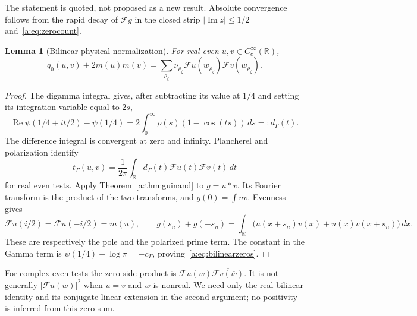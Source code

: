 \documentclass[11pt,a4paper]{article}
\numberwithin{equation}{section}
\newtheorem{lemma}[theorem]{Lemma}
\theoremstyle{definition}\newtheorem{definition}[theorem]{Definition}
\theoremstyle{remark}\newtheorem{remark}[theorem]{Remark}
\newcommand{\R}{\mathbb R}\newcommand{\C}{\mathbb C}\newcommand{\N}{\mathbb N}
\newcommand{\tg}{t_\Gamma}\newcommand{\cg}{c_\Gamma}
\begin{document}
The statement is quoted, not proposed as a new result. Absolute convergence follows from the rapid decay of $\mathcal Fg$ in the closed strip $|\operatorname{Im}z|\le1/2$ and~\eqref{a:eq:zerocount}.

\begin{lemma}[Bilinear physical normalization]\label{a:lem:bilinear}
For real even $u,v\in C_c^\infty(\R)$,
\begin{equation}\label{a:eq:bilinearzeros}
 q_0(u,v)+2m(u)m(v)
   =\sum_{\rho_\zeta}\nu_{\rho_\zeta}
       \mathcal Fu(w_{\rho_\zeta})\mathcal Fv(w_{\rho_\zeta}).
\end{equation}
\end{lemma}
\begin{proof}
The digamma integral \cite[Eq.~5.9.16]{DLMF} gives, after subtracting its value at $1/4$ and setting its integration variable equal to $2s$,
\begin{equation}\label{a:eq:digammamultiplier}
 \operatorname{Re}\psi(1/4+it/2)-\psi(1/4)
    =2\int_0^\infty\rho(s)(1-\cos(ts))\,ds=:d_\Gamma(t).
\end{equation}
The difference integral is convergent at zero and infinity. Plancherel and polarization identify
\[
 \tg(u,v)=\frac1{2\pi}\int_\R
       d_\Gamma(t)\mathcal Fu(t)\mathcal Fv(t)\,dt
\]
for real even tests. Apply Theorem~\ref{a:thm:guinand} to $g=u*v$. Its Fourier transform is the product of the two transforms, and $g(0)=\int uv$. Evenness gives
\[
 \mathcal Fu(i/2)=\mathcal Fu(-i/2)=m(u),\qquad
 g(s_n)+g(-s_n)
  =\int_\R\bigl(u(x+s_n)v(x)+u(x)v(x+s_n)\bigr)\,dx.
\]
These are respectively the pole and the polarized prime term. The constant in the Gamma term is $\psi(1/4)-\log\pi=-\cg$, proving~\eqref{a:eq:bilinearzeros}.
\end{proof}

For complex even tests the zero-side product is
$\mathcal Fu(w)\overline{\mathcal Fv(\overline w)}$. It is not generally $|\mathcal Fu(w)|^2$ when $u=v$ and $w$ is nonreal. We need only the real bilinear identity and its conjugate-linear extension in the second argument; no positivity is inferred from this zero sum.
\end{document}
